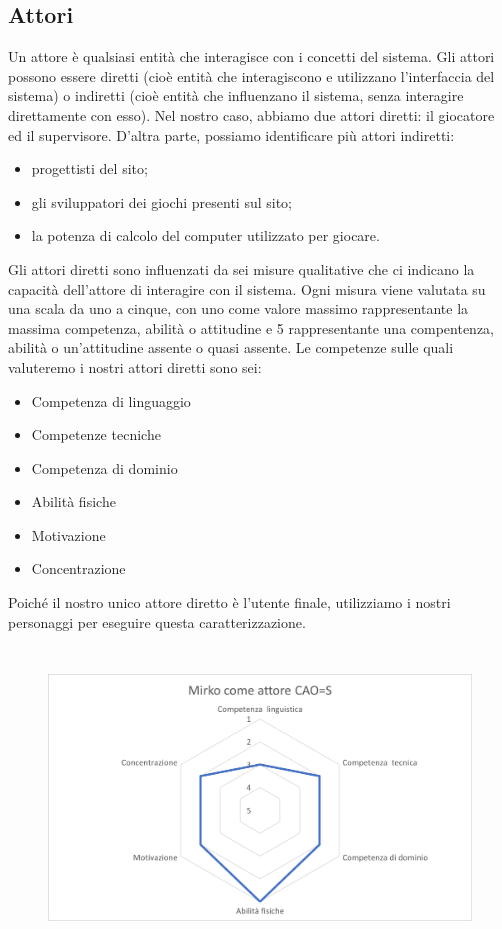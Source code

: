 \documentclass[../Report.tex]{subfiles}
\begin{document}
    \subsection{Attori}
    Un attore è qualsiasi entità che interagisce con i concetti del sistema. Gli attori possono essere diretti (cioè entità che interagiscono e utilizzano l'interfaccia del sistema) o indiretti (cioè entità che influenzano il sistema, senza interagire direttamente con esso). Nel nostro caso, abbiamo due attori diretti: il giocatore ed il supervisore. D'altra parte, possiamo identificare più attori indiretti:
    \begin{itemize}
        \item progettisti del sito;
        \item gli sviluppatori dei giochi presenti sul sito;
        \item la potenza di calcolo del computer utilizzato per giocare.
    \end{itemize}
    Gli attori diretti sono influenzati da sei misure qualitative che ci indicano la capacità dell'attore di interagire con il sistema. Ogni misura viene valutata su una scala da uno a cinque, con uno come valore massimo rappresentante la massima competenza, abilità o attitudine e 5 rappresentante una compentenza, abilità o un'attitudine assente o quasi assente. 
    Le competenze sulle quali valuteremo i nostri attori diretti sono sei:
    \begin{itemize}
        \item Competenza di linguaggio 
        \item Competenze tecniche 
        \item Competenza di dominio
        \item Abilità fisiche 
        \item Motivazione 
        \item Concentrazione
    \end{itemize}
    Poiché il nostro unico attore diretto è l'utente finale, utilizziamo i nostri personaggi per eseguire questa caratterizzazione.
    \begin{figure}[H]
        \includegraphics[height=8cm]{MirkoCAOS.png}
        \centering
    \end{figure}
\end{document}
